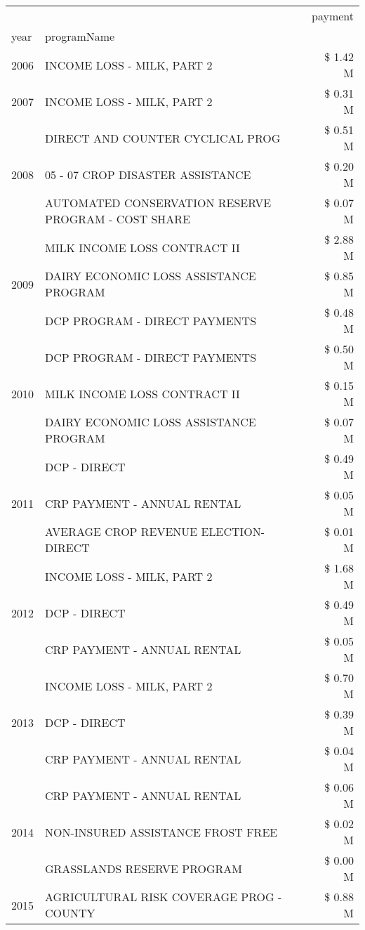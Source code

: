 \begin{tabular}{llr}
\toprule
 &  & payment \\
year & programName &  \\
\midrule
2006 & INCOME LOSS - MILK, PART 2 & \$ 1.42 M \\
\cline{1-3}
2007 & INCOME LOSS - MILK, PART 2 & \$ 0.31 M \\
\cline{1-3}
\multirow[t]{3}{*}{2008} & DIRECT AND COUNTER CYCLICAL PROG & \$ 0.51 M \\
 & 05 - 07 CROP DISASTER ASSISTANCE & \$ 0.20 M \\
 & AUTOMATED CONSERVATION RESERVE PROGRAM - COST SHARE & \$ 0.07 M \\
\cline{1-3}
\multirow[t]{3}{*}{2009} & MILK INCOME LOSS CONTRACT II & \$ 2.88 M \\
 & DAIRY ECONOMIC LOSS ASSISTANCE PROGRAM & \$ 0.85 M \\
 & DCP PROGRAM - DIRECT PAYMENTS & \$ 0.48 M \\
\cline{1-3}
\multirow[t]{3}{*}{2010} & DCP PROGRAM - DIRECT PAYMENTS & \$ 0.50 M \\
 & MILK INCOME LOSS CONTRACT II & \$ 0.15 M \\
 & DAIRY ECONOMIC LOSS ASSISTANCE PROGRAM & \$ 0.07 M \\
\cline{1-3}
\multirow[t]{3}{*}{2011} & DCP - DIRECT & \$ 0.49 M \\
 & CRP PAYMENT - ANNUAL RENTAL & \$ 0.05 M \\
 & AVERAGE CROP REVENUE ELECTION-DIRECT & \$ 0.01 M \\
\cline{1-3}
\multirow[t]{3}{*}{2012} & INCOME LOSS - MILK, PART 2 & \$ 1.68 M \\
 & DCP - DIRECT & \$ 0.49 M \\
 & CRP PAYMENT - ANNUAL RENTAL & \$ 0.05 M \\
\cline{1-3}
\multirow[t]{3}{*}{2013} & INCOME LOSS - MILK, PART 2 & \$ 0.70 M \\
 & DCP - DIRECT & \$ 0.39 M \\
 & CRP PAYMENT - ANNUAL RENTAL & \$ 0.04 M \\
\cline{1-3}
\multirow[t]{3}{*}{2014} & CRP PAYMENT - ANNUAL RENTAL & \$ 0.06 M \\
 & NON-INSURED ASSISTANCE FROST FREE & \$ 0.02 M \\
 & GRASSLANDS RESERVE PROGRAM & \$ 0.00 M \\
\cline{1-3}
\multirow[t]{3}{*}{2015} & AGRICULTURAL RISK COVERAGE PROG - COUNTY & \$ 0.88 M \\

\end{tabular}
